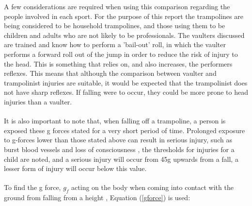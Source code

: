 \noindent A few considerations are required when using this comparison regarding the people involved in each sport. For the purpose of this report the trampolines are being considered to be household trampolines, and those using them to be children and adults who are not likely to be professionals. The vaulters discussed are trained and know how to perform a 'bail-out' roll, in which the vaulter performs a forward roll out of the jump in order to reduce the risk of injury to the head. This is something that relies on, and also increases, the performers reflexes. This means that although the comparison between vaulter and trampolinist injuries are suitable, it would be expected that the trampolinist does not have sharp reflexes. If falling were to occur, they could be more prone to head injuries than a vaulter.
\\
\\
\noindent It is also important to note that, when falling off a trampoline, a person is exposed these g forces stated for a very short period of time. Prolonged exposure to g-forces lower than those stated above can result in serious injury, such as burst blood vessels and loss of consciousness \cite{gs}, the thresholds for injuries for a child are noted, and a serious injury will occur from 45g upwards from a fall, a lesser form of injury will occur below this value.
\\
\\
\noindent To find the g force, $g_f$ acting on the body when coming into contact with the ground from falling from a height \cite{gcalc}, Equation (\ref{gforce}) is used:

